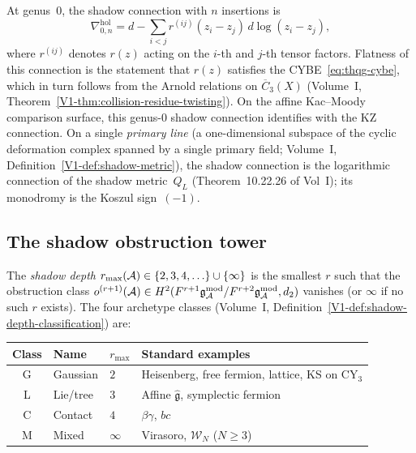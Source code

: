 \begin{remark}
At genus~$0$, the shadow connection with $n$ insertions is
\begin{equation}%
\nabla^{\mathrm{hol}}_{0,n}
= d - \sum_{i<j} r^{(ij)}(z_i - z_j)\, d\log(z_i - z_j),
\end{equation}
where $r^{(ij)}$ denotes $r(z)$ acting on the $i$-th and $j$-th
tensor factors. Flatness of this connection is the statement that
$r(z)$ satisfies the CYBE~\eqref{eq:thqg-cybe}, which in turn
follows from the Arnold relations on $\overline{C}_3(X)$
(Volume~I, Theorem~\ref{V1-thm:collision-residue-twisting}).
On the affine Kac--Moody comparison surface, this genus-$0$
shadow connection identifies with the KZ connection.
On a single \emph{primary line} (a one-dimensional
subspace of the cyclic deformation complex spanned by a
single primary field; Volume~I,
Definition~\ref{V1-def:shadow-metric}), the shadow connection
is the logarithmic
connection of the shadow metric~$Q_L$
(Theorem~10.22.26 of Vol~I); its monodromy
is the Koszul sign~$(-1)$.
\end{remark}


\subsection{The shadow obstruction tower}

\begin{definition}
\label{def:thqg-shadow-archetype}
The \emph{shadow depth} $r_{\max}(\mathcal{A}) \in \{2,3,4,\ldots\} \cup \{\infty\}$ is
the smallest $r$ such that the obstruction class
$o^{(r+1)}(\mathcal{A}) \in H^2(F^{r+1}\mathfrak{g}_{\mathcal{A}}^{\mathrm{mod}} / F^{r+2}\mathfrak{g}_{\mathcal{A}}^{\mathrm{mod}}, d_2)$ vanishes
(or $\infty$ if no such $r$ exists). The four archetype classes
(Volume~I, Definition~\ref{V1-def:shadow-depth-classification}) are:
\begin{center}
\renewcommand{\arraystretch}{1.2}
\small
\begin{tabular}{clll}
\textbf{Class} & \textbf{Name} & $r_{\max}$ & \textbf{Standard examples} \\
\hline
G & Gaussian & $2$ & Heisenberg, free fermion, lattice, KS on CY$_3$ \\
L & Lie/tree & $3$ & Affine $\widehat{\mathfrak{g}}$, symplectic fermion \\
C & Contact & $4$ & $\beta\gamma$, $bc$ \\
M & Mixed & $\infty$ & Virasoro, $\mathcal{W}_N$ ($N \ge 3$)
\end{tabular}
\end{center}
\end{definition}

